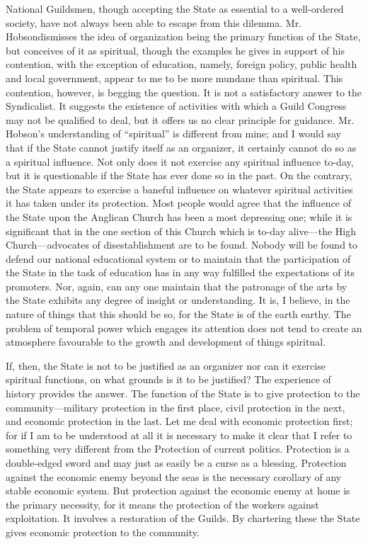 \documentclass{book}
\begin{document}
National Guildsmen, though accepting the State as essential to a well-ordered society, have not always been able to escape from this dilemma. Mr. Hobson\footnotemark[1] dismisses the idea of organization being the primary function of the State, but conceives of it as spiritual, though the examples he gives in support of his contention, with the exception of education, namely, foreign policy, public health and local government, appear to me to be more mundane than spiritual. This contention, however, is begging the question. It is not a satisfactory answer to the Syndicalist. It suggests the existence of activities with which a Guild Congress may not be qualified to deal, but it offers us no clear principle for guidance. Mr. Hobson’s understanding of “spiritual” is different from mine; and I would say that if the State cannot justify itself as an organizer, it certainly cannot do so as a spiritual influence. Not only does it not exercise any spiritual influence to-day, but it is questionable if the State has ever done so in the past. On the contrary, the State appears to exercise a baneful influence on whatever spiritual activities it has taken under its protection. Most people would agree that the influence of the State upon the Anglican Church has been a most depressing one; while it is significant that in the one section of this Church which is to-day alive—the High Church—advocates of disestablishment are to be found. Nobody will be found to defend our national educational system or to maintain that the participation of the State in the task of education has in any way fulfilled the expectations of its promoters. Nor, again, can any one maintain that the patronage of the arts by the State exhibits any degree of insight or understanding. It is, I believe, in the nature of things that this should be so, for the State is of the earth earthy. The problem of temporal power which engages its attention does not tend to create an atmosphere favourable to the growth and development of things spiritual.

If, then, the State is not to be justified as an organizer nor can it exercise spiritual functions, on what grounds is it to be justified? The experience of history provides the answer. The function of the State is to give protection to the community—military protection in the first place, civil protection in the next, and economic protection in the last. Let me deal with economic protection first; for if I am to be understood at all it is necessary to make it clear that I refer to something very different from the Protection of current politics. Protection is a double-edged sword and may just as easily be a curse as a blessing. Protection against the economic enemy beyond the seas is the necessary corollary of any stable economic system. But protection against the economic enemy at home is the primary necessity, for it means the protection of the workers against exploitation. It involves a restoration of the Guilds. By chartering these the State gives economic protection to the community.
\end{document}
